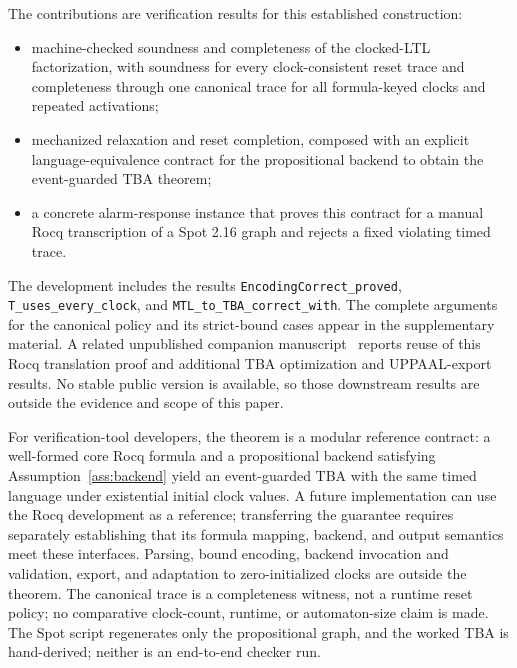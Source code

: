 \documentclass[10pt,journal,compsoc]{IEEEtran}
\begin{document}
The contributions are verification results for this established
construction:
\begin{itemize}
  \item machine-checked soundness and completeness of the clocked-LTL
        factorization, with soundness for every clock-consistent reset trace
        and completeness through one canonical trace for all formula-keyed
        clocks and repeated activations;
  \item mechanized relaxation and reset completion, composed with an
        explicit language-equivalence contract for the propositional
        backend to obtain the event-guarded TBA theorem;
  \item a concrete alarm-response instance that proves this contract for a
        manual Rocq transcription of a Spot 2.16 graph and rejects a fixed
        violating timed trace.
\end{itemize}

The development includes the results
\texttt{EncodingCorrect\_proved}, \texttt{T\_uses\_every\_clock}, and
\texttt{MTL\_\allowbreak{}to\_\allowbreak{}TBA\_\allowbreak{}correct\_\allowbreak{}with}. The complete arguments for the
canonical policy and its strict-bound cases appear in the supplementary
material. A related unpublished companion manuscript~\cite{fares_bodeveix_tba_optimization}
reports reuse of this Rocq translation
proof and additional TBA optimization and UPPAAL-export results. No stable
public version is available, so those downstream results are outside the
evidence and scope of this paper.

For verification-tool developers, the theorem is a modular reference
contract: a well-formed core Rocq formula and a propositional backend
satisfying Assumption~\ref{ass:backend} yield an event-guarded TBA with the
same timed language under existential initial clock values. A future
implementation can use the Rocq development as a reference; transferring the
guarantee requires separately establishing that its formula mapping, backend,
and output semantics meet these interfaces. Parsing, bound encoding, backend
invocation and validation, export, and adaptation to zero-initialized clocks
are outside the theorem.
The canonical trace is a completeness witness, not a runtime reset policy;
no comparative clock-count, runtime, or automaton-size claim is made. The
Spot script regenerates only the propositional graph, and the worked TBA is
hand-derived; neither is an end-to-end checker run.

\raggedbottom
\afterpage{\flushbottom}
\end{document}
